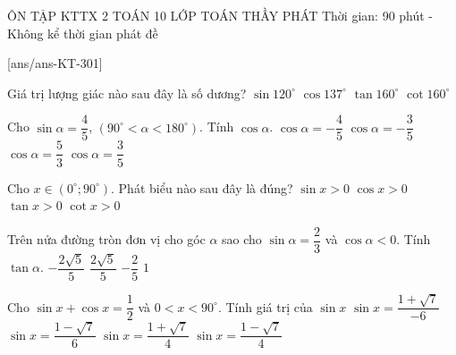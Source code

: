 \begin{name}
	{ÔN TẬP KTTX 2}
	{TOÁN 10}
	{LỚP TOÁN THẦY PHÁT}
	{Thời gian: 90 phút - Không kể thời gian phát đề}
\end{name}
\TN
\setcounter{ex}{0}\setcounter{ex}{0}
[ans/ans-KT-301]
\begin{ex}
	Giá trị lượng giác nào sau đây là số dương?
	\choice
	{\True $\sin 120^\circ$}
	{$\cos 137^\circ$}
	{$\tan 160^\circ$}
	{$\cot 160^\circ$}
\end{ex}
\begin{ex}
	Cho $\sin\alpha=\dfrac{4}{5}$, $\left(90^\circ<\alpha <180^\circ\right)$. Tính $\cos\alpha $.
	\choice
	{$\cos\alpha=-\dfrac{4}{5}$}
	{\True $\cos\alpha=-\dfrac{3}{5}$}
	{$\cos\alpha=\dfrac{5}{3}$}
	{$\cos\alpha=\dfrac{3}{5}$}
\end{ex}
\begin{ex}
	Cho $x\in\left(0^\circ;90^\circ\right)$. Phát biểu nào sau đây là đúng?
	\choice
	{\True $\sin x>0$}
	{$\cos x>0$}
	{$\tan x>0$}
	{$\cot x>0$}
\end{ex}
\begin{ex}
	Trên nửa đường tròn đơn vị cho góc $\alpha$ sao cho $\sin\alpha=\dfrac{2}{3}$ và $\cos\alpha<0$. Tính $\tan\alpha$.
	\choice
	{\True $-\dfrac{2\sqrt{5}}{5}$}
	{$\dfrac{2\sqrt{5}}{5}$}
	{$-\dfrac{2}{5}$}
	{$1$}
\end{ex}
\begin{ex}
	Cho $\sin x+\cos x=\dfrac{1}{2}$ và $0<x<90^\circ$. Tính giá trị của $\sin x$
	\choice
	{$\sin x=\dfrac{1+\sqrt{7}}{-6}$}
	{$\sin x=\dfrac{1-\sqrt{7}}{6}$}
	{\True $\sin x=\dfrac{1+\sqrt{7}}{4}$}
	{$\sin x=\dfrac{1-\sqrt{7}}{4}$}
\end{ex}
